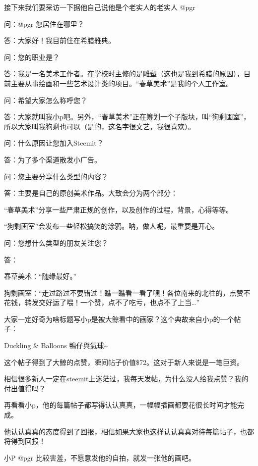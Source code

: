 \documentclass[]{ctexbook}
\begin{document}
接下来我们要采访一下据他自己说他是个老实人的老实人 @pgr

问：@pgr 您居住在哪里？

答：大家好！我目前住在希腊雅典。

问：您的职业是？

答：我是一名美术工作者。在学校时主修的是雕塑（这也是我到希腊的原因），目前主要从事绘画和一些艺术设计类的项目。``春草美术''是我的个人工作室。

问：希望大家怎么称呼您？

答：大家就叫我小p吧。另外，``春草美术''正在筹划一个子版块，叫``狗剩画室''，所以大家叫我狗剩也可以（是的，这名字很文艺，我很喜欢）。

问：什么原因让您加入Steemit？

答：为了多个渠道散发小广告。

问：您主要分享什么类型的内容？

答：主要是自己的原创美术作品。大致会分为两个部分：

``春草美术''分享一些严肃正规的创作，以及创作的过程，背景，心得等等。

``狗剩画室''会发布一些轻松搞笑的涂鸦。呐，做人呢，最重要是开心。

问：您想什么类型的朋友关注您？

答：

春草美术：``随缘最好。''

狗剩画室：``走过路过不要错过！瞧一瞧看一看了嘿！各位南来的北往的，点赞不花钱，转发交好运了喂！一个赞，点不了吃亏，也点不了上当\ldots{}''

大家一定好奇为啥标题写小p是被大鲸看中的画家？这个典故来自小p的一个帖子：

Duckling \& Balloons 鴨仔與氣球\textasciitilde{}

这个帖子得到了大鲸的点赞，瞬间帖子价值\$72。这对于新人来说是一笔巨资。

相信很多新人一定在steemit上迷茫过，我每天发帖，为什么没人给我点赞？我的付出值得吗？

再看看小p，他的每篇帖子都写得认认真真，一幅幅插画都要花很长时间才能完成。

他认认真真的态度得到了回报，相信如果大家也这样认认真真对待每篇帖子，也都将得到回报！

小P @pgr 比较害羞，不愿意发他的自拍，就发一张他的画吧。
\end{document}
